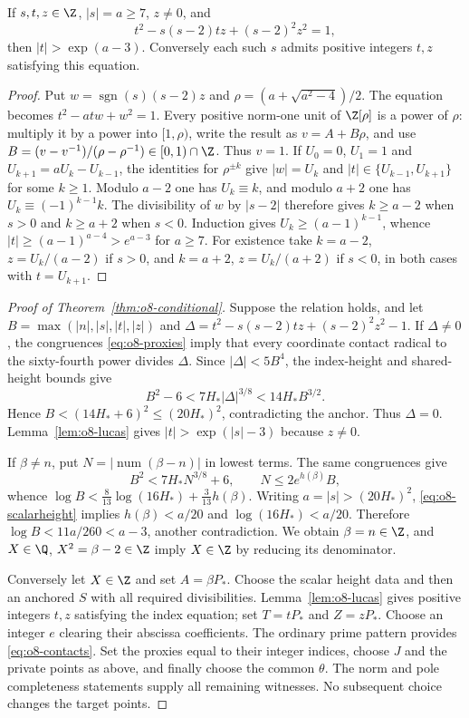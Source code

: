 \begin{lemma}\label{lem:o8-lucas}
If $s,t,z\in\Z$, $|s|=a\ge7$, $z\ne0$, and
\[
 t^2-s(s-2)tz+(s-2)^2z^2=1,
\]
then $|t|>\exp(a-3)$. Conversely each such $s$ admits positive
integers $t,z$ satisfying this equation.
\end{lemma}
\begin{proof}
Put $w=\operatorname{sgn}(s)(s-2)z$ and
$\rho=(a+\sqrt{a^2-4})/2$. The equation becomes
$t^2-atw+w^2=1$. Every positive norm-one unit of $\Z[\rho]$ is a
power of $\rho$: multiply it by a power into $[1,\rho)$, write the
result as $v=A+B\rho$, and use
$B=(v-v^{-1})/(\rho-\rho^{-1})\in[0,1)\cap\Z$.
Thus $v=1$. If $U_0=0$, $U_1=1$ and
$U_{k+1}=aU_k-U_{k-1}$, the identities for $\rho^{\pm k}$ give
$|w|=U_k$ and $|t|\in\{U_{k-1},U_{k+1}\}$ for some $k\ge1$.
Modulo $a-2$ one has $U_k\equiv k$, and modulo $a+2$ one has
$U_k\equiv(-1)^{k-1}k$. The divisibility of $w$ by $|s-2|$ therefore
gives $k\ge a-2$ when $s>0$ and $k\ge a+2$ when $s<0$.
Induction gives $U_k\ge(a-1)^{k-1}$, whence
$|t|\ge(a-1)^{a-4}>e^{a-3}$ for $a\ge7$.
For existence take $k=a-2$, $z=U_k/(a-2)$ if $s>0$, and
$k=a+2$, $z=U_k/(a+2)$ if $s<0$, in both cases with $t=U_{k+1}$.
\end{proof}

\begin{proof}[Proof of Theorem~\ref{thm:o8-conditional}]
Suppose the relation holds, and let
$B=\max(|n|,|s|,|t|,|z|)$ and
$\Delta=t^2-s(s-2)tz+(s-2)^2z^2-1$.
If $\Delta\ne0$, the congruences \eqref{eq:o8-proxies} imply that
every coordinate contact radical to the sixty-fourth power divides
$\Delta$. Since $|\Delta|<5B^4$, the index-height and shared-height
bounds give
\[
 B^2-6<7H_*|\Delta|^{3/8}<14H_*B^{3/2}.
\]
Hence $B<(14H_*+6)^2\le(20H_*)^2$, contradicting the anchor.
Thus $\Delta=0$. Lemma~\ref{lem:o8-lucas} gives
$|t|>\exp(|s|-3)$ because $z\ne0$.

If $\beta\ne n$, put $N=|\operatorname{num}(\beta-n)|$ in lowest
terms. The same congruences give
\[
 B^2<7H_*N^{3/8}+6,\qquad N\le2e^{h(\beta)}B,
\]
whence $\log B<\frac8{13}\log(16H_*)+\frac3{13}h(\beta)$.
Writing $a=|s|>(20H_*)^2$, \eqref{eq:o8-scalarheight} implies
$h(\beta)<a/20$ and $\log(16H_*)<a/20$. Therefore
$\log B<11a/260<a-3$, another contradiction.
We obtain $\beta=n\in\Z$, and $X\in\Q$, $X^2=\beta-2\in\Z$
imply $X\in\Z$ by reducing its denominator.

Conversely let $X\in\Z$ and set $A=\beta P_*$. Choose the scalar
height data and then an anchored $S$ with all required divisibilities.
Lemma~\ref{lem:o8-lucas} gives positive integers $t,z$ satisfying the
index equation; set $T=tP_*$ and $Z=zP_*$. Choose an integer $e$
clearing their abscissa coefficients. The ordinary prime pattern
provides \eqref{eq:o8-contacts}. Set the proxies equal to their integer
indices, choose $J$ and the private points as above, and finally choose
the common $\theta$. The norm and pole completeness statements supply
all remaining witnesses. No subsequent choice changes the target points.
\end{proof}

